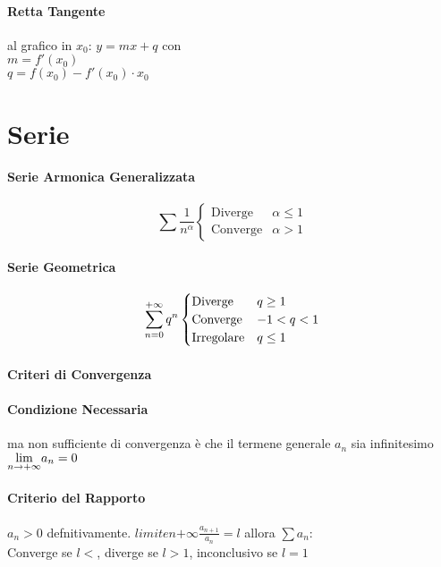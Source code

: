 \documentclass[12pt, a4paper, openany]{book}
\begin{document}
\paragraph*{Retta Tangente} al grafico in $x_0$: $y=mx + q$ con
	\\$m= f'(x_0)$
	\\$q=f(x_0)-f'(x_0)\cdot x_0$


	\section*{Serie}
	\paragraph*{Serie Armonica Generalizzata}
	\begin{equation*}
		\sum \frac{1}{n^\alpha} \begin{cases}
			\text{Diverge}  & \alpha\leq 1 \\
			\text{Converge} & \alpha> 1
		\end{cases}
	\end{equation*}
	\paragraph*{Serie Geometrica}
	\begin{equation*}
		\sum_{n=0}^{+\infty} q^n \begin{cases}
			\text{Diverge}    & q\geq 1 \\
			\text{Converge}   & -1<q<1  \\
			\text{Irregolare} & q\leq 1
		\end{cases}
	\end{equation*}
	\paragraph*{Criteri di Convergenza}
	\paragraph*{Condizione Necessaria} ma non sufficiente di convergenza è che il termene generale $a_n$ sia infinitesimo $\underset{n \to +\infty}{\lim} a_n = 0$

	\paragraph*{Criterio del Rapporto}
$a_n>0$ defnitivamente. $limite{n}{+\infty} \frac{a_{n+1}}{a_n}=l$ allora $\sum a_n$:
	\\Converge se $l<$, diverge se $l>1$, inconclusivo se $l=1$
\end{document}
